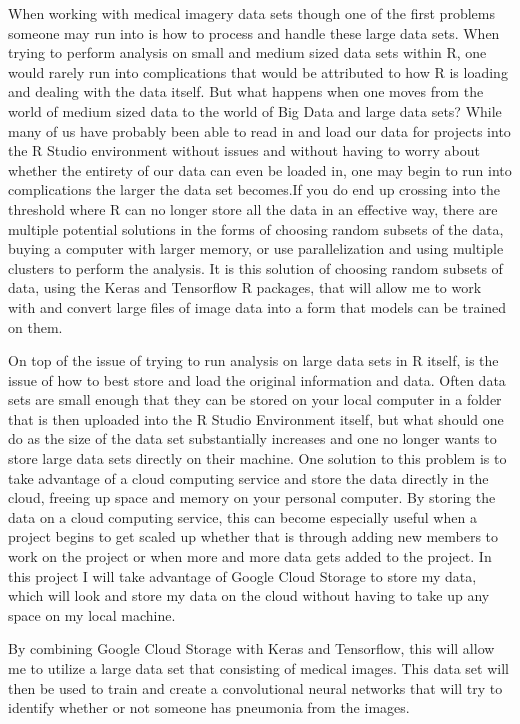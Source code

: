 \documentclass[12pt]{article}
\begin{document}
When working with medical imagery data sets though one of the first
problems someone may run into is how to process and handle these large
data sets. When trying to perform analysis on small and medium sized
data sets within R, one would rarely run into complications that would
be attributed to how R is loading and dealing with the data itself. But
what happens when one moves from the world of medium sized data to the
world of Big Data and large data sets? While many of us have probably
been able to read in and load our data for projects into the R Studio
environment without issues and without having to worry about whether the
entirety of our data can even be loaded in, one may begin to run into
complications the larger the data set becomes.If you do end up crossing
into the threshold where R can no longer store all the data in an
effective way, there are multiple potential solutions in the forms of
choosing random subsets of the data, buying a computer with larger
memory, or use parallelization and using multiple clusters to perform
the analysis. It is this solution of choosing random subsets of data,
using the Keras and Tensorflow R packages, that will allow me to work
with and convert large files of image data into a form that models can
be trained on them.

On top of the issue of trying to run analysis on large data sets in R
itself, is the issue of how to best store and load the original
information and data. Often data sets are small enough that they can be
stored on your local computer in a folder that is then uploaded into the
R Studio Environment itself, but what should one do as the size of the
data set substantially increases and one no longer wants to store large
data sets directly on their machine. One solution to this problem is to
take advantage of a cloud computing service and store the data directly
in the cloud, freeing up space and memory on your personal computer. By
storing the data on a cloud computing service, this can become
especially useful when a project begins to get scaled up whether that is
through adding new members to work on the project or when more and more
data gets added to the project. In this project I will take advantage of
Google Cloud Storage to store my data, which will look and store my data
on the cloud without having to take up any space on my local machine.

By combining Google Cloud Storage with Keras and Tensorflow, this will
allow me to utilize a large data set that consisting of medical images.
This data set will then be used to train and create a convolutional
neural networks that will try to identify whether or not someone has
pneumonia from the images.
\end{document}
